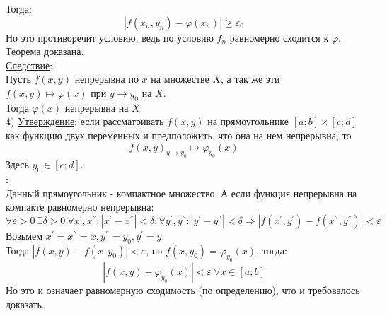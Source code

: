 \documentclass[12pt]{article}
\begin{document}
Тогда:\\
$$|f(x_{n}, y_{n})-\varphi(x_{n})| \geq \varepsilon_0$$
Но это противоречит условию, ведь по условию $f_n$ равномерно сходится к $\varphi$. Теорема доказана.\\
\uline{Следствие}:\\
Пусть $f(x,y)$ непрерывна по $x$ на множестве $X$, а так же эти $f(x,y) \mapsto \varphi(x)$ при $y \to y_0$ на $X$.\\
Тогда $\varphi(x)$ непрерывна на $X$.\\
4) \uline{Утверждение}: если рассматривать $f(x,y)$ на прямоугольнике $[a;b] \times [c;d]$ как функцию двух переменных и предположить, что она на нем непрерывна, то\\
$$f(x,y)_{y \to y_0} \mapsto \varphi_{y_0}(x)$$
Здесь $y_0 \in [c;d]$.\\
:\\
Данный прямоугольник - компактное множество. А если функция непрерывна на компакте равномерно непрерывна:\\
$$\forall \varepsilon > 0 \ \exists \delta > 0 \ \forall x^{'}, x^{''}:|x^{'} - x^{''}| < \delta; \forall y^{'}, y^{''}:|y^{'} - y^{''}| < \delta \Rightarrow |f(x^{'}, y^{'})-f(x^{''},y^{''})|<\varepsilon$$
Возьмем $x^{'} = x^{''} = x, y^{''} = y_0, y^{'} = y$.\\
Тогда $|f(x,y)-f(x,y_0)|<\varepsilon$, но $f(x,y_0) = \varphi_{y_0}(x)$, тогда:\\
$$|f(x,y)-\varphi_{y_0}(x)| < \varepsilon \ \forall x \in [a;b]$$
Но это и означает равномерную сходимость (по определению), что и требовалось доказать.\\
\end{document}

